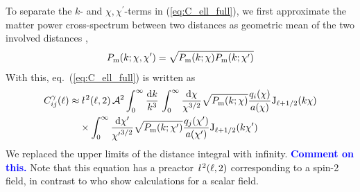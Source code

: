 \documentclass[useAMS,usenatbib]{mn2e} %
\newcommand{\ellbar}{\hbox{\it \l}\,}
\newcommand{\pref}{{\cal A}}
\newcommand{\mk}[1]{{\bf\textcolor{blue}{#1}}}
\begin{document}
To separate the $k$- and $\chi, \chi^\prime$-terms in (\ref{eq:C_ell_full}), we
first approximate the matter power cross-spectrum between two distances as
geometric mean of the two involved distances \cite{2005PhRvD..72b3516C,2016arXiv161200770K},
%
\begin{equation}
 P_{\rm m}(k; \chi, \chi^\prime) = \sqrt{ P_{\rm m}(k; \chi) P_{\rm m}(k; \chi^\prime) }
  \label{eq:P_geom_mean}
\end{equation}
%
With this, eq.~(\ref{eq:C_ell_full}) is written as
%
\begin{align}
  C^\gamma_{ij}(\ell) \approx & \, \ellbar^2(\ell, 2) \, \pref^2
                \int_0^\infty \frac{{\rm d} k}{k^3} \,
                \int_{0}^\infty \frac{{\rm d} \chi}{\chi^{3/2}} \sqrt{P_{\rm m}(k; \chi)}
                \frac{q_i(\chi)}{a(\chi)} {\rm J}_{\ell+1/2}(k \chi)
                \nonumber \\
                 & \times
                \int_{0}^\infty \frac{{\rm d} \chi^\prime}{{\chi^\prime}^{3/2}}
                \sqrt{P_{\rm m}(k; \chi^\prime)} \frac{q_j(\chi^\prime)}{a(\chi^\prime)} {\rm J}_{\ell+1/2}(k \chi^\prime)
  \label{eq:C_ell_full_Pk}
\end{align}
%
We replaced the upper limits of the distance integral with infinity. \mk{Comment on this.}
Note that this equation has a preactor $\ellbar^2(\ell, 2)$ corresponding to a spin-2 field, in contrast
to \cite{2008PhRvD..78l3506L} who show calculations for a scalar field.
\end{document}
